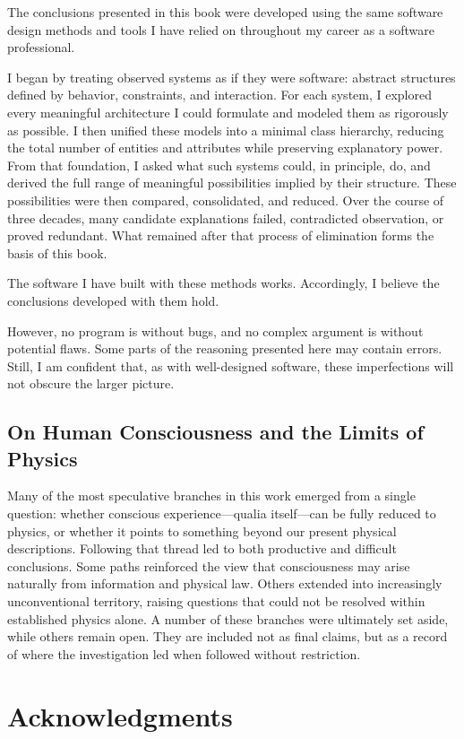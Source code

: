 The conclusions presented in this book were developed using the same software design methods and tools I have relied on throughout my career as a software professional.

I began by treating observed systems as if they were software: abstract structures defined by behavior, constraints, and interaction.
For each system, I explored every meaningful architecture I could formulate and modeled them as rigorously as possible.
I then unified these models into a minimal class hierarchy, reducing the total number of entities and attributes while preserving explanatory power.
From that foundation, I asked what such systems could, in principle, do, and derived the full range of meaningful possibilities implied by their structure.
These possibilities were then compared, consolidated, and reduced.
Over the course of three decades, many candidate explanations failed, contradicted observation, or proved redundant.
What remained after that process of elimination forms the basis of this book.

The software I have built with these methods works. Accordingly, I believe the conclusions developed with them hold.

However, no program is without bugs, and no complex argument is without potential flaws. Some parts of the reasoning presented here may contain errors. Still, I am confident that, as with well-designed software, these imperfections will not obscure the larger picture.

\subsection*{On Human Consciousness and the Limits of Physics}

Many of the most speculative branches in this work emerged from a single question:
whether conscious experience—qualia itself—can be fully reduced to physics, or whether it points to something beyond our present physical descriptions.
Following that thread led to both productive and difficult conclusions.
Some paths reinforced the view that consciousness may arise naturally from information and physical law.
Others extended into increasingly unconventional territory, raising questions that could not be resolved within established physics alone.
A number of these branches were ultimately set aside, while others remain open.
They are included not as final claims, but as a record of where the investigation led when followed without restriction.

\section*{Acknowledgments}

